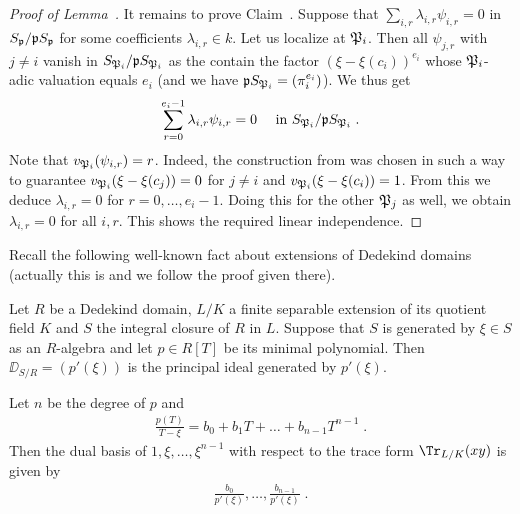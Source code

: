 \documentclass[a4paper,parskip=half,numbers=enddot, DIV=12]{scrreprt}
\begin{document}
\begin{proof}[Proof of Lemma~]
	It remains to prove Claim~. Suppose that $\sum_{i,r}\lambda_{i,r}\psi_{i,r}=0$ in $S_{\mathfrak{p}}/\mathfrak{p} S_{\mathfrak{p}}$ for some coefficients $\lambda_{i,r}\in k$. Let us localize at $\mathfrak{P}_i$. Then all $\psi_{j,r}$ with $j\neq i$ vanish in $S_{\mathfrak{P}_i}/\mathfrak{p} S_{\mathfrak{P}_i}$ as the contain the factor $(\xi-\xi(c_i))^{e_i}$ whose $\mathfrak{P}_i$-adic valuation equals $e_i$ (and we have $\mathfrak{p} S_{\mathfrak{P}_i}=(\pi_i^{e_i})$). We thus get
	\begin{align*}
		\sum_{r=0}^{e_i-1}\lambda_{i,r}\psi_{i,r}=0\quad\text{ in }S_{\mathfrak{P}_i}/\mathfrak{p} S_{\mathfrak{P}_i}\;.
	\end{align*}
	Note that $v_{\mathfrak{P}_i}(\psi_{i,r})=r$. Indeed, the construction from  was chosen in such a way to guarantee $v_{\mathfrak{P}_i}(\xi-\xi(c_j))=0$ for $j\neq i$ and $v_{\mathfrak{P}_i}(\xi-\xi(c_i))=1$. From this we deduce $\lambda_{i,r}=0$ for $r=0,\ldots,e_i-1$. Doing this for the other $\mathfrak{P}_j$ as well, we obtain $\lambda_{i,r}=0$ for all $i,r$. This shows the required linear independence.
\end{proof}
Recall the following well-known fact about extensions of Dedekind domains (actually this is \cite[Ch.\ III, (2.4)]{NEUKIRCH} and we follow the proof given there).
\begin{prop}
	Let $R$ be a Dedekind domain, $L/K$ a finite separable extension of its quotient field $K$ and $S$ the integral closure of $R$ in $L$. Suppose that $S$ is generated by $\xi\in S$ as an $R$-algebra and let $p\in R[T]$ be its minimal polynomial. Then $\DD_{S/R}=(p'(\xi))$ is the principal ideal generated by $p'(\xi)$.
\end{prop}
\begin{lem}
	Let $n$ be the degree of $p$ and
	\begin{align*}
		\frac{p(T)}{T-\xi}=b_0+b_1T+\ldots+b_{n-1}T^{n-1}\;.
	\end{align*}
	Then the dual basis of $1,\xi,\ldots,\xi^{n-1}$ with respect to the trace form $\Tr_{L/K}(xy)$ is given by
	\begin{align*}
		\frac{b_0}{p'(\xi)},\ldots,\frac{b_{n-1}}{p'(\xi)}\;.
	\end{align*}
\end{lem}
\end{document}
